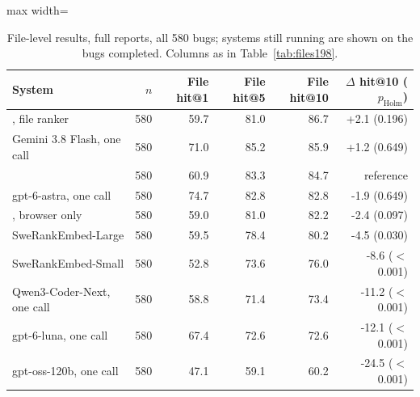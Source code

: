 \begin{table}[t]
\centering
\small
\caption{File-level results, full reports, all 580 bugs; systems still running are shown on the bugs completed. Columns as in Table~\ref{tab:files198}.}
\label{tab:files580}
\begin{adjustbox}{max width=\linewidth}\begin{tabular}{lrrrrr}
\toprule
System & $n$ & File hit@1 & File hit@5 & File hit@10 & $\Delta$ hit@10 ($p_{\mathrm{Holm}}$) \\
\midrule
\tool{}, file ranker & 580 & 59.7 & 81.0 & 86.7 & +2.1 (0.196) \\
Gemini 3.8 Flash, one call & 580 & 71.0 & 85.2 & 85.9 & +1.2 (0.649) \\
\toolgpu{} & 580 & 60.9 & 83.3 & 84.7 & reference \\
gpt-6-astra, one call & 580 & 74.7 & 82.8 & 82.8 & -1.9 (0.649) \\
\tool{}, browser only & 580 & 59.0 & 81.0 & 82.2 & -2.4 (0.097) \\
SweRankEmbed-Large & 580 & 59.5 & 78.4 & 80.2 & -4.5 (0.030) \\
SweRankEmbed-Small & 580 & 52.8 & 73.6 & 76.0 & -8.6 ($<$0.001) \\
Qwen3-Coder-Next, one call & 580 & 58.8 & 71.4 & 73.4 & -11.2 ($<$0.001) \\
gpt-6-luna, one call & 580 & 67.4 & 72.6 & 72.6 & -12.1 ($<$0.001) \\
gpt-oss-120b, one call & 580 & 47.1 & 59.1 & 60.2 & -24.5 ($<$0.001) \\
\bottomrule
\end{tabular}\end{adjustbox}
\end{table}
